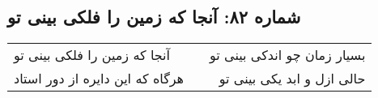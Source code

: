 \begin{center}
\section*{شماره ۸۲: آنجا که زمین را فلکی بینی تو}
\label{sec:082}
\begin{longtable}{l p{0.5cm} r}
آنجا که زمین را فلکی بینی تو
&&
بسیار زمان چو اندکی بینی تو
\\
هرگاه که این دایره از دور استاد
&&
حالی ازل و ابد یکی بینی تو
\\
\end{longtable}
\end{center}
